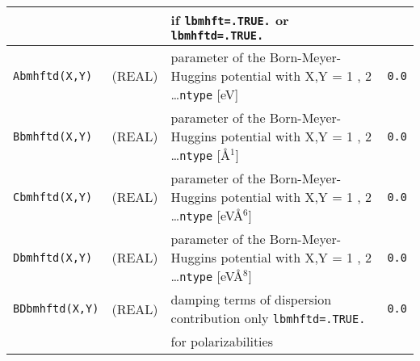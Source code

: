\documentclass[a4paper]{article}
\begin{document}
\begin{longtable}{l|c|m{8cm}|m{2cm}}
\hline
\hline
\rule[-0.75cm]{0cm}{1.5cm}
                 &                    & if \verb?lbmhft=.TRUE.? or \verb?lbmhftd=.TRUE.?                                    & \\
\hline
\rule[-0.75cm]{0cm}{1.5cm}
\verb?Abmhftd(X,Y)?          
                 & (REAL)             & parameter of the Born-Meyer-Huggins potential 
                                        with X,Y = 1 , 2 \ldots \verb?ntype? [eV]                                           & \verb?0.0? \\
\hline
\rule[-0.75cm]{0cm}{1.5cm}
\verb?Bbmhftd(X,Y)?          
                 & (REAL)             & parameter of the Born-Meyer-Huggins potential 
                                        with X,Y = 1 , 2 \ldots \verb?ntype? [\AA$^1$]                                      & \verb?0.0? \\
\hline
\rule[-0.75cm]{0cm}{1.5cm}
\verb?Cbmhftd(X,Y)?          
                 & (REAL)             & parameter of the Born-Meyer-Huggins potential
                                        with X,Y = 1 , 2 \ldots \verb?ntype? [eV\AA$^6$]                                    & \verb?0.0? \\
\hline
\rule[-0.75cm]{0cm}{1.5cm}
\verb?Dbmhftd(X,Y)?          
                 & (REAL)             & parameter of the Born-Meyer-Huggins potential
                                        with X,Y = 1 , 2 \ldots \verb?ntype? [eV\AA$^8$]                                    & \verb?0.0? \\
\hline
\rule[-0.75cm]{0cm}{1.5cm}
\verb?BDbmhftd(X,Y)?         
                 & (REAL)             &  damping terms of dispersion contribution only \verb?lbmhftd=.TRUE.?                & \verb?0.0? \\
\hline
\hline
\rule[-0.75cm]{0cm}{1.5cm}
                 &                    & for polarizabilities                                                                &  \\


\end{longtable}
\end{document}
